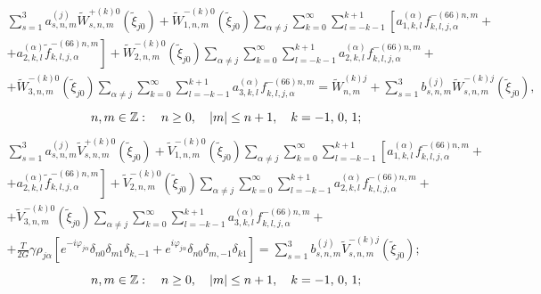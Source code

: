 \begin{multline}
\sum\limits_{s = 1}^3 {a_{s,n,m}^{(j)}} \tilde W_{s,n,m}^{ + (k)0}({\tilde \xi _{j0}}) + \tilde W_{1,n,m}^{ - (k)0}({\tilde \xi _{j0}})\sum\limits_{\alpha  \ne j} {\sum\limits_{k = 0}^\infty  {\sum\limits_{l =  - k - 1}^{k + 1} {\left[ {a_{1,k,l}^{(\alpha )}f_{k,l,j,\alpha }^{ - (66)n,m} + } \right.} } } \\
\left. { + a_{2,k,l}^{(\alpha )}\tilde f_{k,l,j,\alpha }^{ - (66)n,m}} \right] + \tilde W_{2,n,m}^{ - (k)0}({\tilde \xi _{j0}})\sum\limits_{\alpha  \ne j} {\sum\limits_{k = 0}^\infty  {\sum\limits_{l =  - k - 1}^{k + 1} {a_{2,k,l}^{(\alpha )}} } f_{k,l,j,\alpha }^{ - (66)n,m} + } \\
+ \tilde W_{3,n,m}^{ - (k)0}({\tilde \xi _{j0}})\sum\limits_{\alpha  \ne j} {\sum\limits_{k = 0}^\infty  {\sum\limits_{l =  - k - 1}^{k + 1} {a_{3,k,l}^{(\alpha )}} } f_{k,l,j,\alpha }^{ - (66)n,m}}  = \tilde W_{n,m}^{(k)j} + \sum\limits_{s = 1}^3 {b_{s,n,m}^{(j)}} \tilde W_{s,n,m}^{ - (k)j}({\tilde \xi _{j0}}),
\end{multline}
$$
n,m \in\mathbb{Z}:\quad n \ge 0,\quad |m| \le n + 1,\quad k =  - 1,{\mkern 1mu} {\kern 1pt} 0,{\mkern 1mu} {\kern 1pt} 1;
$$
\begin{multline}
\sum\limits_{s = 1}^3 {a_{s,n,m}^{(j)}} \tilde V_{s,n,m}^{ + (k)0}({\tilde \xi _{j0}}) + \tilde V_{1,n,m}^{ - (k)0}({\tilde \xi _{j0}})\sum\limits_{\alpha  \ne j} {\sum\limits_{k = 0}^\infty  {\sum\limits_{l =  - k - 1}^{k + 1} {\left[ {a_{1,k,l}^{(\alpha )}f_{k,l,j,\alpha }^{ - (66)n,m} + } \right.} } } \\
\left. { + a_{2,k,l}^{(\alpha )}\tilde f_{k,l,j,\alpha }^{ - (66)n,m}} \right] + \tilde V_{2,n,m}^{ - (k)0}({\tilde \xi _{j0}})\sum\limits_{\alpha  \ne j} {\sum\limits_{k = 0}^\infty  {\sum\limits_{l =  - k - 1}^{k + 1} {a_{2,k,l}^{(\alpha )}} } f_{k,l,j,\alpha }^{ - (66)n,m} + } \\
+ \tilde V_{3,n,m}^{ - (k)0}({\tilde \xi _{j0}})\sum\limits_{\alpha  \ne j} {\sum\limits_{k = 0}^\infty  {\sum\limits_{l =  - k - 1}^{k + 1} {a_{3,k,l}^{(\alpha )}} } f_{k,l,j,\alpha }^{ - (66)n,m} + } \\
+ \frac{T}{{2G}}\gamma {\rho _{j\alpha }}\left[ {{e^{ - i{\varphi _{j\alpha }}}}{\delta _{n0}}{\delta _{m1}}{\delta _{k, - 1}} + {e^{i{\varphi _{j\alpha }}}}{\delta _{n0}}{\delta _{m, - 1}}{\delta _{k1}}} \right] = \sum\limits_{s = 1}^3 {b_{s,n,m}^{(j)}} \tilde V_{s,n,m}^{ - (k)j}({\tilde \xi _{j0}});
\end{multline}
$$
n,m \in\mathbb{Z}:\quad n \ge 0,\quad |m| \le n + 1,\quad k =  - 1,{\mkern 1mu} {\kern 1pt} 0,{\mkern 1mu} {\kern 1pt} 1;
$$
